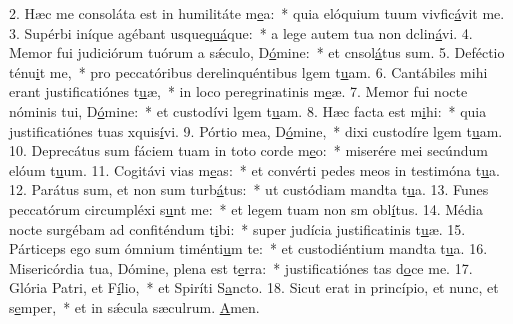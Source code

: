 2. Hæc me consoláta est in humilitáte m\uline{e}a:~* quia elóquium tuum vivfic\uline{á}vit me.
3. Supérbi iníque agébant usque\uline{quá}que:~* a lege autem tua non dclin\uline{á}vi.
4. Memor fui judiciórum tuórum a sǽculo, D\uline{ó}mine:~* et cnsol\uline{á}tus sum.
5. Deféctio ténu\uline{i}t me,~* pro peccatóribus derelinquéntibus lgem t\uline{u}am.
6. Cantábiles mihi erant justificatiónes t\uline{u}æ,~* in loco peregrinatinis m\uline{e}æ.
7. Memor fui nocte nóminis tui, D\uline{ó}mine:~* et custodívi lgem t\uline{u}am.
8. Hæc facta est m\uline{i}hi:~* quia justificatiónes tuas xquis\uline{í}vi.
9. Pórtio mea, D\uline{ó}mine,~* dixi custodíre lgem t\uline{u}am.
10. Deprecátus sum fáciem tuam in toto corde m\uline{e}o:~* miserére mei secúndum elóum t\uline{u}um.
11. Cogitávi vias m\uline{e}as:~* et convérti pedes meos in testimóna t\uline{u}a.
12. Parátus sum, et non sum turb\uline{á}tus:~* ut custódiam mandta t\uline{u}a.
13. Funes peccatórum circumpléxi s\uline{u}nt me:~* et legem tuam non sm obl\uline{í}tus.
14. Média nocte surgébam ad confiténdum t\uline{i}bi:~* super judícia justificatinis t\uline{u}æ.
15. Párticeps ego sum ómnium timénti\uline{u}m te:~* et custodiéntium mandta t\uline{u}a.
16. Misericórdia tua, Dómine, plena est t\uline{e}rra:~* justificatiónes tas d\uline{o}ce me.
17. Glória Patri, et F\uline{í}lio,~* et Spiríti S\uline{a}ncto.
18. Sicut erat in princípio, et nunc, et s\uline{e}mper,~* et in sǽcula sæculrum. \uline{A}men.
